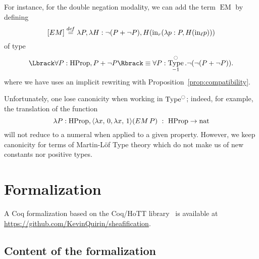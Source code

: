 \documentclass[preprint,9pt,numbers]{sigplanconf}
\newcommand \defeq {\overset{de\hspace{-0.2ex}f}{=}}
\DeclareMathOperator{\Type}{Type}
\DeclareMathOperator{\HProp}{HProp}
\DeclareMathOperator{\nat}{nat}
\newcommand{\modal}{\ensuremath{\ocircle}}
\newenvironment{mymath}[1][-0em]{%
  \newcommand\mymathaux{\vspace{#1}}%
  \vspace{#1}%
  \begin{equation*}%
  }{ %
    \mymathaux%
  \end{equation*}}
\begin{document}
For instance, for the double negation modality, we can add the term
$\mathop{EM}$ by defining 
$$
[\mathop{EM}] \defeq \lambda P, \lambda H : \lnot (P + \lnot P), H (\mathrm{in}_r (\lambda
p : P, H (\mathrm{in}_\ell p)))
$$
of type 
$$
\Lbrack \forall P:\HProp, P + \lnot P \Rbrack \equiv \forall
P:\Type^\modal_{-1}. \lnot (\lnot (P + \lnot P)).
$$
where we have uses an implicit rewriting with
Proposition~\ref{prop:compatibility}.

Unfortunately, one lose canonicity when working in $\Type^\modal$;
indeed, for example, the translation of the function 
\begin{mymath}
\lambda P:\HProp, \langle \lambda x,\,0 ,\lambda x,\,1\rangle (\mathop{EM} P)~:~\HProp
                     \to \nat\end{mymath}%
will not reduce to a numeral when applied to a given
property. However, we keep canonicity for terms of Martin-Löf Type
theory which do not make us of new constants nor positive types. 
%

\section{Formalization} 
\label{sec:formalization}

A Coq formalization based on the Coq/HoTT library~\cite{hottlib} is available at
\url{https://github.com/KevinQuirin/sheafification}.
%

\subsection{Content of the formalization}
\label{sec:cont-form}
\end{document}
